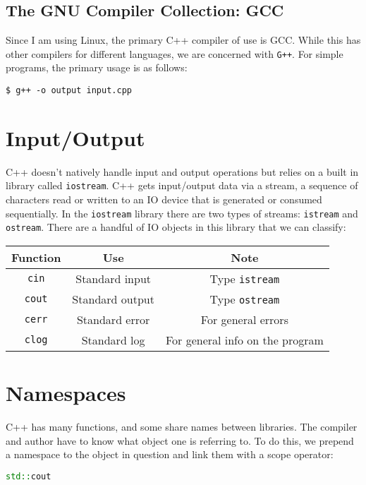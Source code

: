 \documentclass[12pt, a4paper]{report}
\begin{document}
\subsection{The GNU Compiler Collection: GCC}
Since I am using Linux, the primary C++ compiler of use is GCC. While this has other compilers for different languages, we are concerned with \verb|G++|.
For simple programs, the primary usage is as follows: 

\begin{center}
  \verb|$ g++ -o output input.cpp|
\end{center}

\section{Input/Output}
C++ doesn't natively handle input and output operations but relies on a built in library called \verb|iostream|. C++ gets input/output data via a stream, a sequence of characters read or written to an IO device that is generated or consumed sequentially. 
In the \verb|iostream| library there are two types of streams: \verb|istream| and \verb|ostream|. There are a handful of IO objects in this library that we can classify:

\begin{center}
  \begin{tabular}{ |c|c|c| }
    \hline
    \textbf{Function} & \textbf{Use} & \textbf{Note} \\
    \hline
    \verb|cin| & Standard input & Type \verb|istream| \\
    \hline
    \verb|cout| & Standard output & Type \verb|ostream| \\
    \hline
    \verb|cerr| & Standard error & For general errors \\
    \hline
    \verb|clog| & Standard log & For general info on the program \\
    \hline
  \end{tabular}
\end{center}

\section{Namespaces}
C++ has many functions, and some share names between libraries. The compiler and author have to know what object one is referring to. To do this, we prepend a namespace to the object in question and link them with a scope operator:

\begin{lstlisting}[language=C++]
    std::cout
\end{lstlisting}
\end{document}
